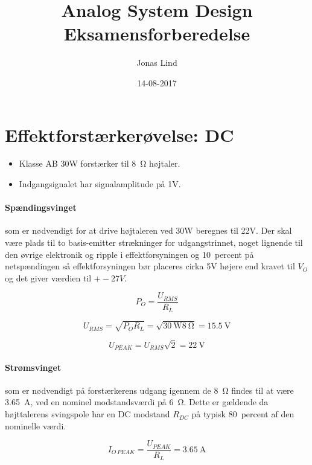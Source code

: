 \documentclass[danish]{article}
\begin{document}
\title{\textbf{Analog System Design} \\Eksamensforberedelse}
\author{Jonas Lind}
\date{14-08-2017}
\maketitle
\section{Effektforstærkerøvelse: DC}
\begin{itemize}
	\item Klasse AB 30W forstærker til \SI{8}{\ohm} højtaler.
	\item Indgangsignalet har signalamplitude på 1V.
\end{itemize}

\paragraph{Spændingsvinget} som er nødvendigt for at drive højtaleren ved 30W beregnes til 22V. Der skal være plads til to basis-emitter strækninger for udgangstrinnet, noget lignende til den øvrige elektronik og ripple i effektforsyningen og  \SI{10}{percent}  på netspændingen så effektforsyningen bør placeres cirka 5V højere end kravet til $V_O$ og det giver værdien til $+-27V$.

\begin{equation}
P_O = \dfrac{U_{RMS}}{R_L}
\end{equation}

\begin{equation}
U_{RMS} = \sqrt{P_O R_L} = \sqrt{\SI{30}{\watt} \SI{8}{\ohm}} = \SI{15.5}{\volt}
\end{equation}

\begin{equation}
U_{PEAK} = U_{RMS} \sqrt{2} = \SI{22}{\volt}
\end{equation}
\paragraph{Strømsvinget} som er nødvendigt på forstærkerens udgang igennem de \SI{8}{\ohm} findes til at være \SI{3.65}{\ampere}, ved en nominel modstandsværdi på \SI{6}{\ohm}. Dette er gældende da højttalerens svingspole har en DC modstand $R_{DC}$ på typisk \SI{80}{percent}  af den nominelle værdi.

\begin{equation}
I_{O\,PEAK} = \dfrac{U_{PEAK}}{R_L} = \SI{3.65}{\ampere}
\end{equation}
\end{document}
